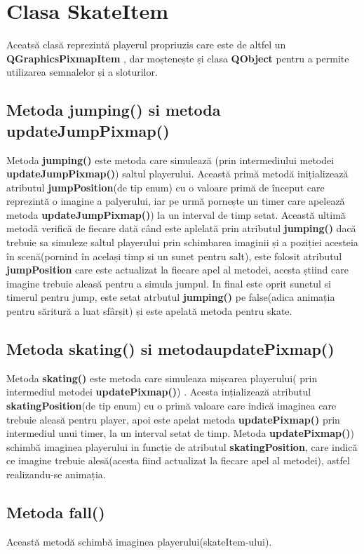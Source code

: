 \documentclass{article}
\begin{document}
\section{Clasa SkateItem} 
Aceatsă clasă reprezintă playerul propriuzis care este de altfel un \textbf{QGraphicsPixmapItem} , dar moștenește și clasa \textbf{QObject}
pentru a permite utilizarea semnalelor și a sloturilor.

\subsection{Metoda jumping() si metoda updateJumpPixmap()}
Metoda \textbf{jumping()} este metoda care simulează (prin intermediului metodei \textbf{updateJumpPixmap()}) saltul playerului. Această primă metodă inițializează atributul \textbf{jumpPosition}(de tip enum) cu o valoare primă de început care reprezintă o imagine a palyerului, iar pe urmă pornește un timer care apelează metoda \textbf{updateJumpPixmap()}) la un interval de timp setat. Această ultimă metodă verifică de fiecare dată când este aplelată prin atributul \textbf{jumping()}
dacă trebuie sa simuleze saltul playerului prin schimbarea imaginii și a poziției acesteia în scenă(pornind în același timp si un sunet pentru salt), este folosit atributul \textbf{jumpPosition} care este actualizat la fiecare apel al metodei, acesta știind care imagine trebuie aleasă pentru a simula jumpul. In final este oprit sunetul si timerul pentru jump, este setat atrbutul  \textbf{jumping()} pe false(adica animația pentru săritură a luat sfârșit) și este apelată metoda pentru skate.

\subsection{Metoda skating() si metodaupdatePixmap()}
Metoda \textbf{skating()} este metoda care simuleaza mișcarea playerului( prin intermediul metodei \textbf{updatePixmap()}) . Acesta ințializează atributul \textbf{skatingPosition}(de tip enum) cu o primă valoare care indică imaginea care trebuie aleasă pentru player, apoi este apelat metoda \textbf{updatePixmap()}
prin intermediul unui timer, la un interval setat de timp. Metoda \textbf{updatePixmap()}) schimbă imaginea playerului in funcție de atributul
\textbf{skatingPosition}, care indică ce imagine trebuie alesă(acesta fiind actualizat la fiecare apel al metodei), astfel realizandu-se animația.

\subsection{Metoda fall()}
Această metodă schimbă imaginea playerului(skateItem-ului).
\end{document}
